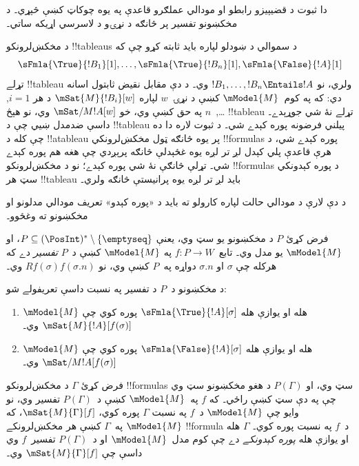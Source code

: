 \documentclass[../../../include/open-logic-section]{subfiles}
\begin{document}


\begin{editorial}
  دا ثبوت د قضيېيزو رابطو او مودالي عملګرو قاعدې په يوه چوکاټ
  کښې څېړي۔ د مخکښونو تفسير پر څانګه د نړۍو د لاسرسي اړيکه ساتي۔
\end{editorial}

\begin{explain}
  د مخکښ‌لرونکو !!{tableau}s د سموالي د ښودلو لپاره بايد ثابته
  کړو چې که
  \[
  \sFmla{\True}{!B_1}[1], \dots, \sFmla{\True}{!B_n}[1], \sFmla{\False}{!A}[1]
  \]
  تړلے !!{tableau} ولري، نو $!B_1, \dots, !B_n \Entails !A$ وي۔
  د دې مقابل نقيض ثابتول اسانه دي: که په کوم~$\mModel{M}$ کښې د
  نړۍ~$w$ لپاره $\mSat{M}{!B_i}[w]$ د هر $i=1$, \dots,~$n$
  په حق کښې وي، خو $\mSat/{M}{!A}[w]$ وي، نو هېڅ
  !!{tableau} تړلے نۀ شي جوړېدے۔
  داسې ضدمدل ښيي چې د !!{tableau} پيلني فرضونه پوره کېدے شي۔
  د ثبوت لاره دا ده چې کله د !!a{tableau} پر يوه څانګه ټول
  مخکښ‌لرونکي !!{formula}s پوره کېدے شي، د هرې قاعدې پلي کېدل
  لږ تر لږه يوه غځېدلې څانګه پرېږدي چې هغه هم پوره کېدے شي۔
  تړلې څانګې نۀ شي پوره کېدے؛ نو د مخکښ‌لرونکو !!{formula}s
  د پوره کېدونکي سټ هر !!{tableau} بايد لږ تر لږه يوه پرانيستې
  څانګه ولري۔

  د دې لارې د مودالي حالت لپاره کارولو ته بايد د «پوره کېدو»
  تعريف مودالي مدلونو او مخکښونو ته وغځوو۔
\end{explain}

\begin{defn}
  فرض کړئ $P$ د مخکښونو يو سټ وي، يعنې
  $P \subseteq (\PosInt)^* \setminus \{\emptyseq\}$، او
  $\mModel{M}$ يو مدل وي۔ تابع~$f\colon P \to W$ په
  $\mModel{M}$ کښې د~$P$ \emph{تفسير} دے که هرکله چې
  $\sigma$ او $\sigma.n$ دواړه په~$P$ کښې وي، نو
  $Rf(\sigma)f(\sigma.n)$ وي۔

  د مخکښونو د~$P$ د تفسير په نسبت داسې تعريفولے شو:
  \begin{enumerate}
  \item $\mModel{M}$ هله او يوازې هله
    $\sFmla{\True}{!A}[\sigma]$ پوره کوي چې
    $\mSat{M}{!A}[f(\sigma)]$ وي۔
  \item $\mModel{M}$ هله او يوازې هله
    $\sFmla{\False}{!A}[\sigma]$ پوره کوي چې
    $\mSat/{M}{!A}[f(\sigma)]$ وي۔
  \end{enumerate}
\end{defn}

\begin{defn}
  فرض کړئ $\Gamma$ د مخکښ‌لرونکو !!{formula}s سټ وي، او
  $P(\Gamma)$ د هغو مخکښونو سټ وي چې په دې سټ کښې راځي۔
  که $f$ په~$\mModel{M}$ کښې د~$P(\Gamma)$ تفسير وي، نو وايو
  چې $\mModel{M}$ د~$f$ په نسبت $\Gamma$ پوره کوي،
  $\mSat{M}{\Gamma}[f]$، که $\mModel{M}$ په~$\Gamma$ کښې
  هر مخکښ‌لرونکے !!{formula} د~$f$ په نسبت پوره کوي۔
  $\Gamma$ هله او يوازې هله \emph{پوره کېدونکے} دے چې کوم
  مدل~$\mModel{M}$ او د~$P(\Gamma)$ تفسير~$f$ وي داسې چې
  $\mSat{M}{\Gamma}[f]$ وي۔
\end{defn}
\end{document}
